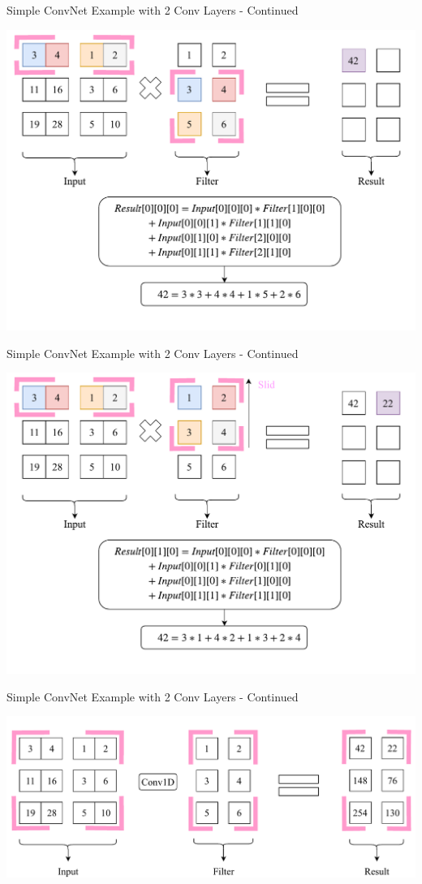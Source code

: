 \documentclass{beamer}
\begin{document}
		\begin{frame}{Simple ConvNet Example with 2 Conv Layers - Continued}
			\begin{center}
				\includegraphics[height=0.9\textheight]{secondConvSample_step1}
			\end{center}
		\end{frame}
		\begin{frame}{Simple ConvNet Example with 2 Conv Layers - Continued}
			\begin{center}
				\includegraphics[height=0.9\textheight]{secondConvSample_step2}
			\end{center}
		\end{frame}
		\begin{frame}{Simple ConvNet Example with 2 Conv Layers - Continued}
			\begin{center}
				\includegraphics[height=0.5\textheight]{secondConvSample_final}
			\end{center}
		\end{frame}
\end{document}
